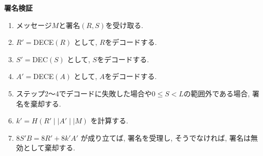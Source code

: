 \vspace{2em}
\let\ltxlist\list
\begin{breakitembox}[l]{\textbf{署名検証}}
　
  \begin{enumerate}[parsep=7pt]
    \item メッセージ$M$と署名$(R,S)$を受け取る.
    \item $R'=$DECE$(R)$ として, $R$をデコードする.
    \item $S'=$DEC$(S)$ として, $S$をデコードする.
    \item $A'=$DECE$(A)$ として, $A$をデコードする.
    \item ステップ2～4でデコードに失敗した場合や$0\leq S<L$の範囲外である場合, 
    署名を棄却する.
    \item $k'=H(R' \mid\mid A' \mid\mid M)$ を計算する.
    \item $8S'B=8R'+8k'A'$ が成り立てば, 署名を受理し, 
    そうでなければ, 署名は無効として棄却する. 
  \end{enumerate}
\end{breakitembox}
% 　
